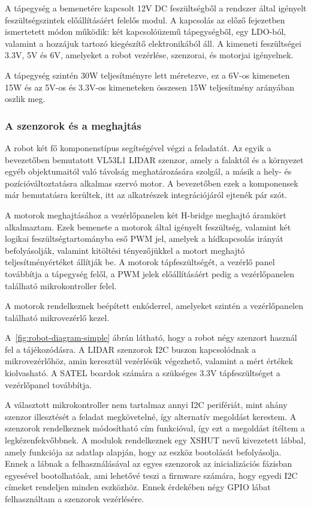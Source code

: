 \medskip

A tápegység a bemenetére kapcsolt 12V DC feszültségből a rendszer által igényelt
feszültségszintek előállításáért felelős modul. A kapcsolás az előző fejezetben
ismertetett módon működik: két kapcsolóüzemű tápegységből, egy LDO-ból, valamint
a hozzájuk tartozó kiegészítő elektronikából áll. A kimeneti feszültségei 3.3V,
5V és 6V, amelyeket a robot vezérlése, szenzorai, és motorjai igényelnek.

A tápegység szintén 30W teljesítményre lett méretezve, ez a 6V-os kimeneten 15W
és az 5V-os és 3.3V-os kimeneteken összesen 15W teljesítmény arányában oszlik
meg. 

\subsubsection{A szenzorok és a meghajtás}

A robot két fő komponenstípus segítségével végzi a feladatát. Az egyik a
bevezetőben bemutatott VL53L1 LIDAR szenzor, amely a falaktól és a környezet
egyéb objektumaitól való távolság meghatározására szolgál, a másik a hely- és
pozícióváltoztatásra alkalmas szervó motor. A bevezetőben ezek a komponensek már
bemutatásra kerültek, itt az alkatrészek integrációjáról ejtenék pár szót.

\medskip

A motorok meghajtásához a vezérlőpanelen két H-bridge meghajtó áramkört
alkalmaztam. Ezek bemenete a motorok által igényelt feszültség, valamint két
logikai feszültségtartományba eső PWM jel, amelyek a hídkapcsolás irányát
befolyásolják, valamint kitöltési tényezőjükkel a motort meghajtó
teljesítményértéket állítják be. A motorok tápfeszültségét, a vezérlő panel
továbbítja a tápegység felől, a PWM jelek előállításáért pedig a vezérlőpanelen
található mikrokontroller felel.

A motorok rendelkeznek beépített enkóderrel, amelyeket szintén a vezérlőpanelen
található mikrovezérlő kezel.

\medskip

A~\ref{fig:robot-diagram-simple} ábrán látható, hogy a robot négy szenzort
használ fel a tájékozódásra. A LIDAR szenzorok I2C buszon kapcsolódnak a
mikrovezérlőhöz, amin keresztül vezérlésük végezhető, valamint a mért értékek
kiolvasható. A SATEL boardok számára a szükséges 3.3V tápfeszültséget a
vezérlőpanel továbbítja.

A választott mikrokontroller nem tartalmaz annyi I2C perifériát, mint ahány
szenzor illesztését a feladat megkövetelné, így alternatív megoldást kerestem. A
szenzorok rendelkeznek módosítható cím funkcióval, így ezt a megoldást ítéltem a
legkézenfekvőbbnek. A modulok rendelkeznek egy XSHUT nevű kivezetett lábbal,
amely funkciója az adatlap alapján, hogy az eszköz bootolását befolyásolja. Ennek
a lábnak a felhasználásával az egyes szenzorok az inicializációs fázisban
egyesével bootolhatóak, ami lehetővé teszi a firmware számára, hogy egyedi I2C
címeket rendeljen minden eszközhöz. Ennek érdekében négy GPIO lábat felhasználtam
a szenzorok vezérlésére.

